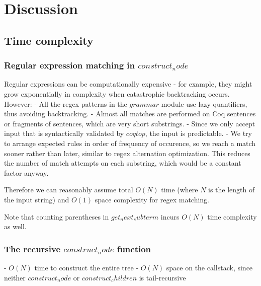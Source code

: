 
\chapter{Discussion} %

\label{dicussion} %



\section{Time complexity}
\subsection{Regular expression matching in $construct_node$
}

Regular expressions can be computationally expensive - for example, they might grow exponentially in complexity when catastrophic backtracking occurs. However:
- All the regex patterns in the $grammar$ module use lazy quantifiers, thus avoiding backtracking.
- Almost all matches are performed on Coq sentences or fragments of sentences, which are very short substrings.
- Since we only accept input that is syntactically validated by $coqtop$, the input is predictable.
- We try to arrange expected rules in order of frequency of occurence, so we reach a match sooner rather than later, similar to regex alternation optimization. This reduces the number of match attempts on each substring, which would be a constant factor anyway.

Therefore we can reasonably assume total $O(N)$ time (where $N$ is the length of the input string) and $O(1)$ space complexity for regex matching.

Note that counting parentheses in $get_next_subterm$ incurs $O(N)$ time complexity as well.

\subsection{The recursive $construct_node $ function}
-  $O(N)$ time to construct the entire tree
- $O(N)$ space on the callstack, since neither $construct_node$ or $construct_children$ is tail-recursive


